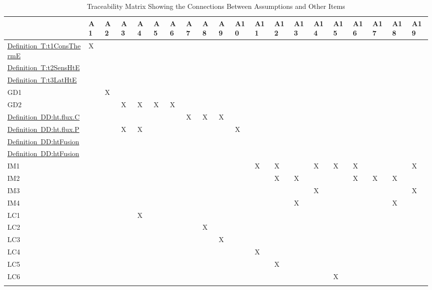 \documentclass[12pt]{article}
\begin{document}
\begin{longtable}{l l l l l l l l l l l l l l l l l l l l}
\toprule
 & A1 & A2 & A3 & A4 & A5 & A6 & A7 & A8 & A9 & A10 & A11 & A12 & A13 & A14 & A15 & A16 & A17 & A18 & A19
\\
\midrule
\hyperref[T:t1ConsThermE]{Definition~T:t1ConsThermE} & X &  &  &  &  &  &  &  &  &  &  &  &  &  &  &  &  &  & 
\\
\hyperref[T:t2SensHtE]{Definition~T:t2SensHtE} &  &  &  &  &  &  &  &  &  &  &  &  &  &  &  &  &  &  & 
\\
\hyperref[T:t3LatHtE]{Definition~T:t3LatHtE} &  &  &  &  &  &  &  &  &  &  &  &  &  &  &  &  &  &  & 
\\
GD1 &  & X &  &  &  &  &  &  &  &  &  &  &  &  &  &  &  &  & 
\\
GD2 &  &  & X & X & X & X &  &  &  &  &  &  &  &  &  &  &  &  & 
\\
\hyperref[DD:ht.flux.C]{Definition~DD:ht.flux.C} &  &  &  &  &  &  & X & X & X &  &  &  &  &  &  &  &  &  & 
\\
\hyperref[DD:ht.flux.P]{Definition~DD:ht.flux.P} &  &  & X & X &  &  &  &  &  & X &  &  &  &  &  &  &  &  & 
\\
\hyperref[DD:htFusion]{Definition~DD:htFusion} &  &  &  &  &  &  &  &  &  &  &  &  &  &  &  &  &  &  & 
\\
\hyperref[DD:htFusion]{Definition~DD:htFusion} &  &  &  &  &  &  &  &  &  &  &  &  &  &  &  &  &  &  & 
\\
IM1 &  &  &  &  &  &  &  &  &  &  & X & X &  & X & X & X &  &  & X
\\
IM2 &  &  &  &  &  &  &  &  &  &  &  & X & X &  &  & X & X & X & 
\\
IM3 &  &  &  &  &  &  &  &  &  &  &  &  &  & X &  &  &  &  & X
\\
IM4 &  &  &  &  &  &  &  &  &  &  &  &  & X &  &  &  &  & X & 
\\
LC1 &  &  &  & X &  &  &  &  &  &  &  &  &  &  &  &  &  &  & 
\\
LC2 &  &  &  &  &  &  &  & X &  &  &  &  &  &  &  &  &  &  & 
\\
LC3 &  &  &  &  &  &  &  &  & X &  &  &  &  &  &  &  &  &  & 
\\
LC4 &  &  &  &  &  &  &  &  &  &  & X &  &  &  &  &  &  &  & 
\\
LC5 &  &  &  &  &  &  &  &  &  &  &  & X &  &  &  &  &  &  & 
\\
LC6 &  &  &  &  &  &  &  &  &  &  &  &  &  &  & X &  &  &  & 
\\
\bottomrule
\caption{Traceability Matrix Showing the Connections Between Assumptions and Other Items}
\label{Table:TracMatrShowtheConnBetwAssuandOtheItem}
\end{longtable}
\end{document}
